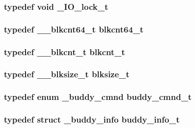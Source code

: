 \subsubsection[{\_\-IO\_\-lock\_\-t}]{\setlength{\rightskip}{0pt plus 5cm}typedef void {\bf \_\-IO\_\-lock\_\-t}}\label{tp_8c_a677e9cddd4b515944f4f72e0c9c357a7}
\subsubsection[{blkcnt64\_\-t}]{\setlength{\rightskip}{0pt plus 5cm}typedef {\bf \_\-\_\-blkcnt64\_\-t} {\bf blkcnt64\_\-t}}\label{tp_8c_a5f02f68da33c09318a4ebdd63fe3d55d}
\subsubsection[{blkcnt\_\-t}]{\setlength{\rightskip}{0pt plus 5cm}typedef {\bf \_\-\_\-blkcnt\_\-t} {\bf blkcnt\_\-t}}\label{tp_8c_a7da4753cd6945c5ad91f41c00b474b3f}
\subsubsection[{blksize\_\-t}]{\setlength{\rightskip}{0pt plus 5cm}typedef {\bf \_\-\_\-blksize\_\-t} {\bf blksize\_\-t}}\label{tp_8c_acac8eacbbc225743e88f8e5e8bf93581}
\subsubsection[{buddy\_\-cmnd\_\-t}]{\setlength{\rightskip}{0pt plus 5cm}typedef enum {\bf \_\-buddy\_\-cmnd}  {\bf buddy\_\-cmnd\_\-t}}\label{tp_8c_a535b2f2f45016f1d808a74f3ea665816}
\subsubsection[{buddy\_\-info\_\-t}]{\setlength{\rightskip}{0pt plus 5cm}typedef struct {\bf \_\-buddy\_\-info} {\bf buddy\_\-info\_\-t}}\label{tp_8c_a6036c7d3d9131044bcf5a6f7a79106f5}
